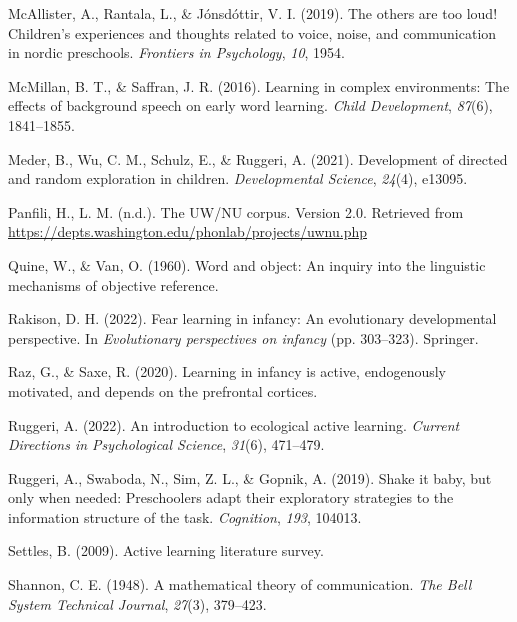 \documentclass[10pt, letterpaper]{article}
\newenvironment{CSLReferences}%
  {}%
  {\par}
\begin{document}
\begin{CSLReferences}{1}{0}
\leavevmode{}%
McAllister, A., Rantala, L., \& Jónsdóttir, V. I. (2019). The others are
too loud! Children's experiences and thoughts related to voice, noise,
and communication in nordic preschools. \emph{Frontiers in Psychology},
\emph{10}, 1954.

\leavevmode{}%
McMillan, B. T., \& Saffran, J. R. (2016). Learning in complex
environments: The effects of background speech on early word learning.
\emph{Child Development}, \emph{87}(6), 1841--1855.

\leavevmode{}%
Meder, B., Wu, C. M., Schulz, E., \& Ruggeri, A. (2021). Development of
directed and random exploration in children. \emph{Developmental
Science}, \emph{24}(4), e13095.

\leavevmode{}%
Panfili, H., L. M. (n.d.). The UW/NU corpus. Version 2.0. Retrieved from
\url{https://depts.washington.edu/phonlab/projects/uwnu.php}

\leavevmode{}%
Quine, W., \& Van, O. (1960). Word and object: An inquiry into the
linguistic mechanisms of objective reference.

\leavevmode{}%
Rakison, D. H. (2022). Fear learning in infancy: An evolutionary
developmental perspective. In \emph{Evolutionary perspectives on
infancy} (pp. 303--323). Springer.

\leavevmode{}%
Raz, G., \& Saxe, R. (2020). Learning in infancy is active, endogenously
motivated, and depends on the prefrontal cortices.

\leavevmode{}%
Ruggeri, A. (2022). An introduction to ecological active learning.
\emph{Current Directions in Psychological Science}, \emph{31}(6),
471--479.

\leavevmode{}%
Ruggeri, A., Swaboda, N., Sim, Z. L., \& Gopnik, A. (2019). Shake it
baby, but only when needed: Preschoolers adapt their exploratory
strategies to the information structure of the task. \emph{Cognition},
\emph{193}, 104013.

\leavevmode{}%
Settles, B. (2009). Active learning literature survey.

\leavevmode{}%
Shannon, C. E. (1948). A mathematical theory of communication. \emph{The
Bell System Technical Journal}, \emph{27}(3), 379--423.


\end{CSLReferences}
\end{document}
